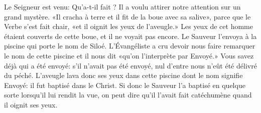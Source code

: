 Le Seigneur est venu: Qu’a-t-il fait ?
	Il a voulu attirer notre attention sur un grand mystère.
«Il cracha à terre et il fit de la boue avec sa salive»,
	parce que le Verbe s’est fait chair, «et il oignit les yeux de l’aveugle.»
Les yeux de cet homme étaient couverts de cette boue,
	et il ne voyait pas encore.
Le Sauveur l’envoya à la piscine qui porte le nom de Siloé.
L’Évangéliste a cru devoir nous faire remarquer le nom de cette piscine
	et il nous dit «qu’on l’interprète par Envoyé.»
Vous savez déjà qui a été envoyé:
	s’il n’avait pas été envoyé, nul d’entre nous n’eût été délivré du péché.
L’aveugle lava donc ses yeux dans cette piscine dont le nom signifie Envoyé:
	il fut baptisé dans le Christ.
Si donc le Sauveur l’a baptisé en quelque sorte lorsqu’il lui rendit la vue,
	on peut dire qu’il l’avait fait catéchumène quand il oignit ses yeux.
